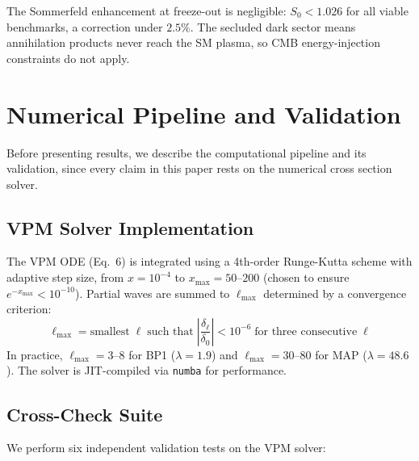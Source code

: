 The Sommerfeld enhancement at freeze-out is negligible: $S_0 < 1.026$
for all viable benchmarks, a correction under $2.5\%$. The secluded dark
sector means annihilation products never reach the SM plasma, so CMB
energy-injection constraints do not apply.

\section{Numerical Pipeline and Validation}
\label{ch1:pipeline}

Before presenting results, we describe the computational pipeline and its
validation, since every claim in this paper rests on the numerical cross
section solver.

\subsection{VPM Solver Implementation}
\label{ch1:solver}

The VPM ODE (Eq.~6) is integrated using a 4th-order Runge-Kutta scheme
with adaptive step size, from $x = 10^{-4}$ to $x_{\max} = 50$--$200$
(chosen to ensure $e^{-x_{\max}} < 10^{-10}$). Partial waves are summed
to $\ell_{\max}$ determined by a convergence criterion:
\begin{equation}
  \ell_{\max} = \text{smallest}\;\ell\;\text{such that}\;
  \left|\frac{\delta_\ell}{\delta_0}\right| < 10^{-6}
  \;\text{for three consecutive}\;\ell
\end{equation}
In practice, $\ell_{\max} = 3$--$8$ for BP1 ($\lambda = 1.9$) and
$\ell_{\max} = 30$--$80$ for MAP ($\lambda = 48.6$). The solver is
JIT-compiled via \texttt{numba} for performance.

\subsection{Cross-Check Suite}
\label{ch1:crosschecks}

We perform six independent validation tests on the VPM solver:

